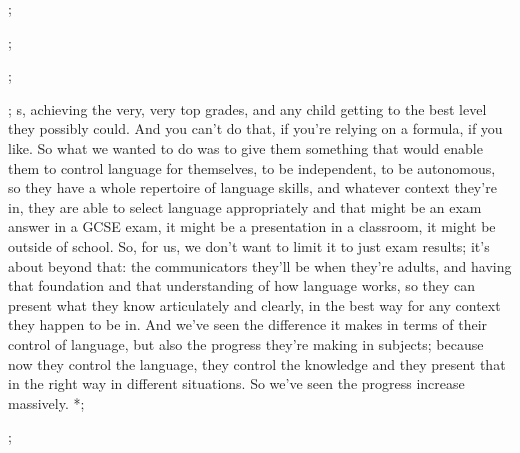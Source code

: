 \documentclass[letterpaper,10pt,english]{sphinxmanual}
\begin{document}
 ;

 ;

 ;

 ; s, achieving the very, very top grades, and any child getting to the best level they possibly could. And you can’t do that, if you’re relying on a formula, if you like. So what we wanted to do was to give them something that would enable them to control language for themselves, to be independent, to be autonomous, so they have a whole repertoire of language skills, and whatever context they’re in, they are able to select
language appropriately \textendash{} and that might be an exam answer in a GCSE exam, it might be a presentation in a classroom, it might be outside of school. \sphinxstyleemphasis{;}So, for us, we don’t want to limit it to just exam results; it’s about beyond that: the communicators they’ll be when they’re adults, and having that foundation and that understanding of how language works, so they can present what they know articulately and clearly, in the best way for any context they happen to be in. And we’ve seen the
difference it makes in terms of their control of language, but also the progress they’re making in subjects; because now they control the language, they control the knowledge and they present that in the right way in different situations. So we’ve seen the progress increase massively. *;

 ;
\end{document}
